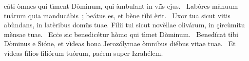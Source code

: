 \psalmChapterWithInscription{}
{ }
{%
eáti òmnes qui tìment Dòminum, qui àmbulant in viïs ejus. 
~Labóres mànuum tuárum quia manducábis~; beátus es, et bène tìbi èrit. 
~Uxor tua sicut vitis abùndans, in latèribus domüs tuae. Fílii tui sicut novèllae olivárum, in çircùmitu mènsae tuae. 
~Ecċe sic benedicétur hòmo qui tìmet Dòminum. 
~Benedícat tìbi Dòminus e Sióne, et vìdeas bona Jerozólymae òmnibus diébus vitae tuae. 
~Et vìdeas fílios filiórum tuórum, paċem super Izrahélem. 
}
